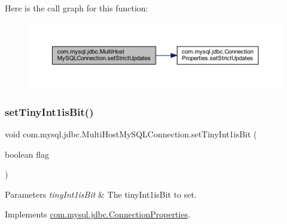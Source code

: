 Here is the call graph for this function\+:
\nopagebreak
\begin{figure}[H]
\begin{center}
\leavevmode
\includegraphics[width=350pt]{classcom_1_1mysql_1_1jdbc_1_1_multi_host_my_s_q_l_connection_ae687926e547ee7430e22ed60f970b1dc_cgraph}
\end{center}
\end{figure}
\mbox{\label{classcom_1_1mysql_1_1jdbc_1_1_multi_host_my_s_q_l_connection_a7f6ba35d4da5c8ab2972086f48f02227}} 
\subsubsection{\texorpdfstring{set\+Tiny\+Int1is\+Bit()}{setTinyInt1isBit()}}
{\footnotesize\ttfamily void com.\+mysql.\+jdbc.\+Multi\+Host\+My\+S\+Q\+L\+Connection.\+set\+Tiny\+Int1is\+Bit (\begin{DoxyParamCaption}\item[{boolean}]{flag }\end{DoxyParamCaption})}


\begin{DoxyParams}{Parameters}
{\em tiny\+Int1is\+Bit} & The tiny\+Int1is\+Bit to set. \\
\hline
\end{DoxyParams}


Implements \mbox{\hyperlink{interfacecom_1_1mysql_1_1jdbc_1_1_connection_properties_ac1fb7af1cc73512dd8dac99bdc7a5602}{com.\+mysql.\+jdbc.\+Connection\+Properties}}.

